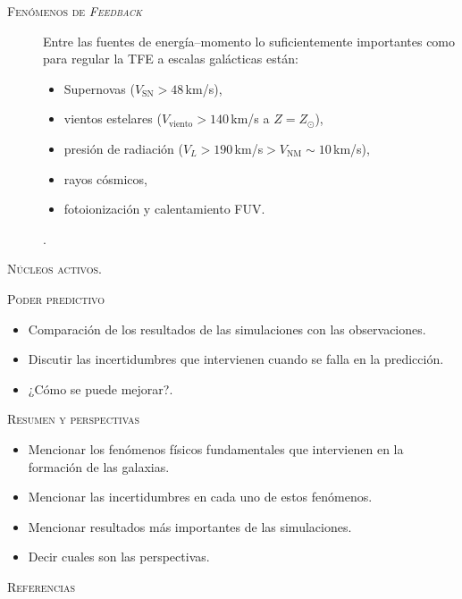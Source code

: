 \documentclass[xcolor=dvipsnames,4pt,hyperref={colorlinks,citecolor=black,linkcolor=black,urlcolor=black}]{beamer}
\begin{document}
\begin{frame}[allowframebreaks]{\textsc{Fenómenos de \emph{Feedback}}}
\begin{description}
Entre las fuentes de energía--momento lo suficientemente importantes como para regular la TFE a
escalas galácticas están:
%
\begin{itemize}
\item Supernovas ($V_\text{SN}>48\,$km/s),
\item vientos estelares ($V_\text{viento}>140\,$km/s a $Z=Z_\odot$),
\item presión de radiación ($V_L>190\,$km/s$>V_\text{NM}\sim10\,$km/s),
\item rayos cósmicos,
\item fotoionización y calentamiento FUV.
\end{itemize}
%
\citep[ver][para una revisión completa]{Krumholz2014}.
%
\item[\textsc{Núcleos activos.}]
%
\end{description}
%
\end{frame}

\begin{frame}[allowframebreaks]{\textsc{Poder predictivo}}
%
\begin{itemize}
\item Comparación de los resultados de las simulaciones con las observaciones.
\item Discutir las incertidumbres que intervienen cuando se falla en la predicción.
\item ¿Cómo se puede mejorar?.
\end{itemize}
%
\end{frame}

\begin{frame}[allowframebreaks]{\textsc{Resumen y perspectivas}}
%
\begin{itemize}
\item Mencionar los fenómenos físicos fundamentales que intervienen en la formación de las galaxias.
\item Mencionar las incertidumbres en cada uno de estos fenómenos.
\item Mencionar resultados más importantes de las simulaciones.
\item Decir cuales son las perspectivas.
\end{itemize}
%
\end{frame}

\begin{frame}[allowframebreaks]{\textsc{Referencias}}
\small
\printbibliography
\end{frame}
\end{document}
